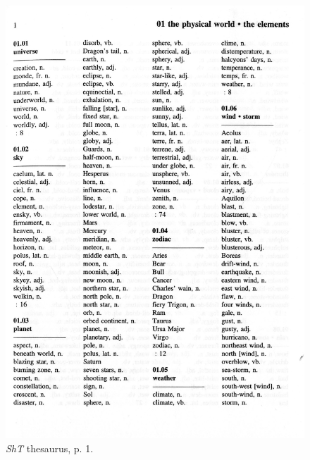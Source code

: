 \begin{figure}[htbp]
  \centering
    \includegraphics[width=\linewidth]{Stolk_thes-content/fig/thes/ShT-p001.jpg}
  \caption{\textit{ShT} thesaurus, p. 1.}
  \label{fig:1.A:ShT:thesaurus}
\end{figure}

